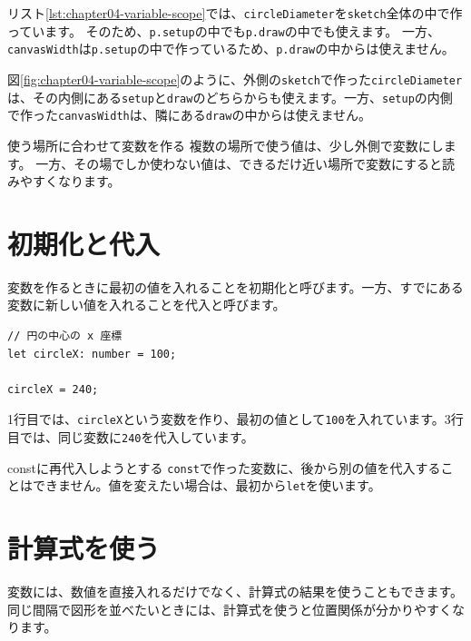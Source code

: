 リスト\ref{lst:chapter04-variable-scope}では、\texttt{circleDiameter}を\texttt{sketch}全体の中で作っています。
そのため、\texttt{p.setup}の中でも\texttt{p.draw}の中でも使えます。
一方、\texttt{canvasWidth}は\texttt{p.setup}の中で作っているため、\texttt{p.draw}の中からは使えません。

図\ref{fig:chapter04-variable-scope}のように、外側の\texttt{sketch}で作った\texttt{circleDiameter}は、その内側にある\texttt{setup}と\texttt{draw}のどちらからも使えます。一方、\texttt{setup}の内側で作った\texttt{canvasWidth}は、隣にある\texttt{draw}の中からは使えません。

\begin{pointbox}{使う場所に合わせて変数を作る}
複数の場所で使う値は、少し外側で変数にします。
一方、その場でしか使わない値は、できるだけ近い場所で変数にすると読みやすくなります。
\end{pointbox}

\section{初期化と代入}

変数を作るときに最初の値を入れることを初期化と呼びます。一方、すでにある変数に新しい値を入れることを代入と呼びます。

\begin{listing}[htbp]
\begin{verbatim}
// 円の中心の x 座標
let circleX: number = 100;

circleX = 240;
\end{verbatim}
\caption{初期化と代入}
\label{lst:chapter04-initialization-assignment}
\end{listing}

1行目では、\texttt{circleX}という変数を作り、最初の値として\texttt{100}を入れています。3行目では、同じ変数に\texttt{240}を代入しています。

\begin{mistakebox}{constに再代入しようとする}
\texttt{const}で作った変数に、後から別の値を代入することはできません。値を変えたい場合は、最初から\texttt{let}を使います。
\end{mistakebox}

\section{計算式を使う}

変数には、数値を直接入れるだけでなく、計算式の結果を使うこともできます。同じ間隔で図形を並べたいときには、計算式を使うと位置関係が分かりやすくなります。

